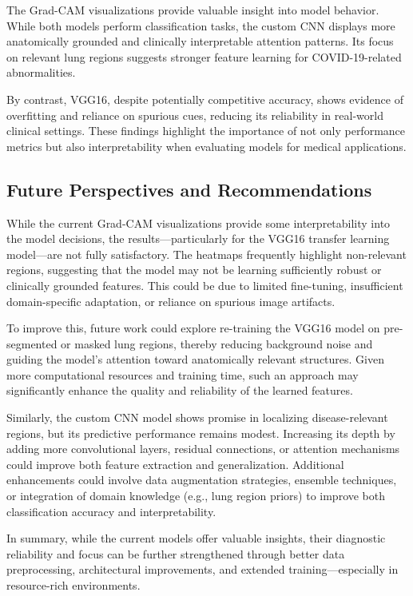 \documentclass{article}
\begin{document}
\vspace{1em}
The Grad-CAM visualizations provide valuable insight into model behavior. While both models perform classification tasks, the custom CNN displays more anatomically grounded and clinically interpretable attention patterns. Its focus on relevant lung regions suggests stronger feature learning for COVID-19-related abnormalities.

By contrast, VGG16, despite potentially competitive accuracy, shows evidence of overfitting and reliance on spurious cues, reducing its reliability in real-world clinical settings. These findings highlight the importance of not only performance metrics but also interpretability when evaluating models for medical applications.


\subsection*{Future Perspectives and Recommendations}

While the current Grad-CAM visualizations provide some interpretability into the model decisions, the results—particularly for the VGG16 transfer learning model—are not fully satisfactory. The heatmaps frequently highlight non-relevant regions, suggesting that the model may not be learning sufficiently robust or clinically grounded features. This could be due to limited fine-tuning, insufficient domain-specific adaptation, or reliance on spurious image artifacts.

To improve this, future work could explore re-training the VGG16 model on pre-segmented or masked lung regions, thereby reducing background noise and guiding the model’s attention toward anatomically relevant structures. Given more computational resources and training time, such an approach may significantly enhance the quality and reliability of the learned features.

Similarly, the custom CNN model shows promise in localizing disease-relevant regions, but its predictive performance remains modest. Increasing its depth by adding more convolutional layers, residual connections, or attention mechanisms could improve both feature extraction and generalization. Additional enhancements could involve data augmentation strategies, ensemble techniques, or integration of domain knowledge (e.g., lung region priors) to improve both classification accuracy and interpretability.

In summary, while the current models offer valuable insights, their diagnostic reliability and focus can be further strengthened through better data preprocessing, architectural improvements, and extended training—especially in resource-rich environments.
\end{document}

